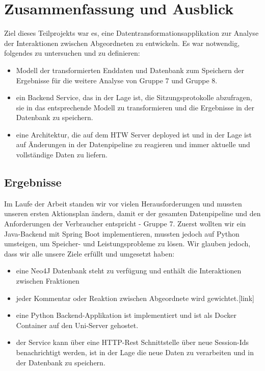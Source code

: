 %
%

\section{Zusammenfassung und Ausblick}\label{sec:06_05_zusammenfassung}
Ziel dieses Teilprojekts war es, eine Datentransformationsapplikation zur Analyse der Interaktionen zwischen Abgeordneten zu entwickeln. Es war notwendig, folgendes zu untersuchen und zu definieren:
\begin{itemize}
  \item Modell der transformierten Enddaten und Datenbank zum Speichern der Ergebnisse für die weitere Analyse von Gruppe 7 und Gruppe 8. 
  \item ein Backend Service, das in der Lage ist, die Sitzungsprotokolle abzufragen, sie in das entsprechende Modell zu transformieren und die Ergebnisse in der Datenbank zu speichern.
  \item eine Architektur, die auf dem HTW Server deployed ist und in der Lage ist auf Änderungen in der Datenpipeline zu reagieren und immer aktuelle und vollständige Daten zu liefern. 
\end{itemize}

\subsection{Ergebnisse}
Im Laufe der Arbeit standen wir vor vielen Herausforderungen und mussten unseren ersten Aktionsplan ändern, damit er der gesamten Datenpipeline und den Anforderungen der Verbraucher entspricht - Gruppe 7. Zuerst wollten wir ein Java-Backend mit Spring Boot implementieren, mussten jedoch auf Python umsteigen, um Speicher- und Leistungsprobleme zu lösen. Wir glauben jedoch, dass wir alle unsere Ziele erfüllt und umgesetzt haben:
\begin{itemize}
    \item eine Neo4J Datenbank steht zu verfügung und enthält die Interaktionen zwischen Fraktionen
    \item jeder Kommentar oder Reaktion zwischen Abgeordnete wird gewichtet.[link] 
    \item eine Python Backend-Applikation ist implementiert und ist als Docker Container auf den Uni-Server gehostet.
    \item der Service kann über eine HTTP-Rest Schnittstelle über neue Session-Ids  benachrichtigt werden, ist in der Lage die neue Daten zu verarbeiten und in der Datenbank zu speichern.
\end{itemize}


